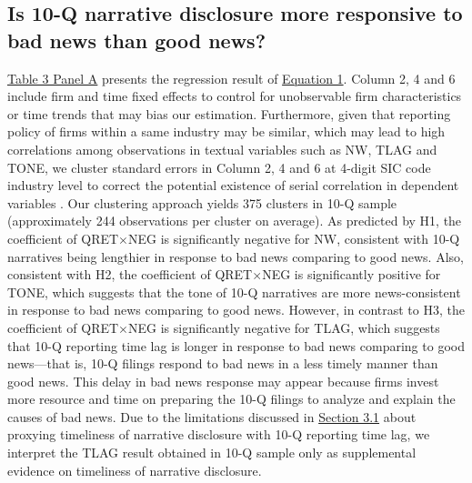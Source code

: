 \documentclass[a4paper]{article}
\begin{document}
\begin{spacing}{2}
\subsection{Is 10-Q narrative disclosure more responsive to bad news than good news?}
\hyperref[T3PA]{Table 3 Panel A} presents the regression result of \hyperref[eq1]{Equation 1}. Column 2, 4 and 6 include firm and time fixed effects to control for unobservable firm characteristics or time trends that may bias our estimation. Furthermore, given that reporting policy of firms within a same industry may be similar, which may lead to high correlations among observations in textual variables such as NW, TLAG and TONE, we cluster standard errors in Column 2, 4 and 6 at 4-digit SIC code industry level to correct the potential existence of serial correlation in dependent variables . Our clustering approach yields 375 clusters in 10-Q sample (approximately 244 observations per cluster on average). As predicted by H1, the coefficient of QRET$\times$NEG is significantly negative for NW, consistent with 10-Q narratives being lengthier in response to bad news comparing to good news. Also, consistent with H2, the coefficient of QRET$\times$NEG is significantly positive for TONE, which suggests that the tone of 10-Q narratives are more news-consistent in response to bad news comparing to good news. However, in contrast to H3, the coefficient of QRET$\times$NEG is significantly negative for TLAG, which suggests that 10-Q reporting time lag is longer in response to bad news comparing to good news---that is, 10-Q filings respond to bad news in a less timely manner than good news. This delay in bad news response may appear because firms invest more resource and time on preparing the 10-Q filings to analyze and explain the causes of bad news. Due to the limitations discussed in \hyperref[sec3.1]{Section 3.1} about proxying timeliness of narrative disclosure with 10-Q reporting time lag, we interpret the TLAG result obtained in 10-Q sample only as supplemental evidence on timeliness of narrative disclosure.


\end{spacing}
\end{document}
